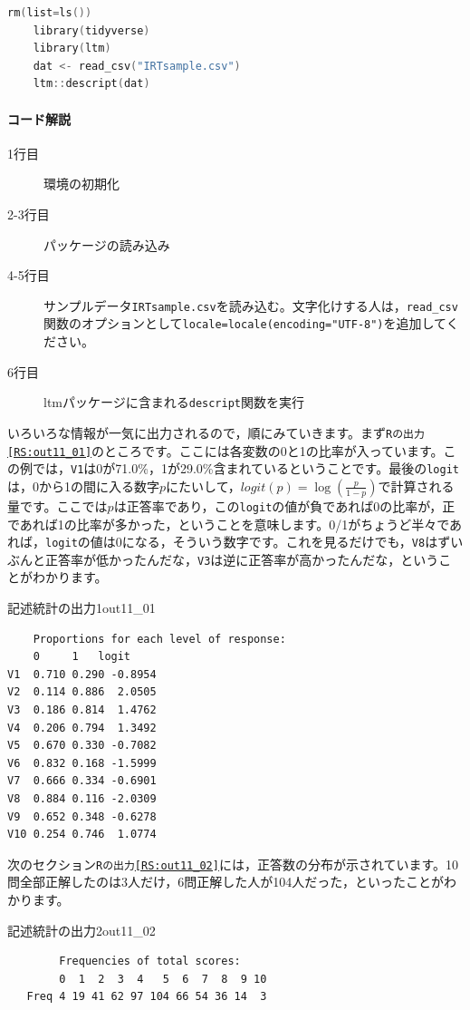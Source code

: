 \documentclass{ltjsbook}
\begin{document}
\begin{lstlisting}[language=c++,label={code:11_01},caption={データの読み込みから記述統計量の計算まで}]
    rm(list=ls())
    library(tidyverse)
    library(ltm)
    dat <- read_csv("IRTsample.csv")
    ltm::descript(dat)
\end{lstlisting}

\paragraph{コード解説}
\begin{description}
	\item[1行目] 環境の初期化
	\item[2-3行目] パッケージの読み込み
	\item[4-5行目] サンプルデータ\texttt{IRTsample.csv}を読み込む。文字化けする人は，\verb|read_csv|関数のオプションとして\texttt{locale=locale(encoding="UTF-8")}を追加してください。
	\item[6行目] ltmパッケージに含まれる\texttt{descript}関数を実行
\end{description}

いろいろな情報が一気に出力されるので，順にみていきます。まず\texttt{Rの出力\ref{RS:out11_01}}のところです。ここには各変数の0と1の比率が入っています。この例では，\texttt{V1}は0が71.0\%，1が29.0\%含まれているということです。最後の\texttt{logit}は，0から1の間に入る数字$p$にたいして，$logit(p)=\log\left(\frac{p}{1-p}\right)$で計算される量です。ここでは$p$は正答率であり，この\texttt{logit}の値が負であれば0の比率が，正であれば1の比率が多かった，ということを意味します。0/1がちょうど半々であれば，\texttt{logit}の値は0になる，そういう数字です。これを見るだけでも，\texttt{V8}はずいぶんと正答率が低かったんだな，\texttt{V3}は逆に正答率が高かったんだな，ということがわかります。
\begin{Rscreen}{記述統計の出力1}{out11_01}
	\begin{verbatim}
    Proportions for each level of response:
    0     1   logit
V1  0.710 0.290 -0.8954
V2  0.114 0.886  2.0505
V3  0.186 0.814  1.4762
V4  0.206 0.794  1.3492
V5  0.670 0.330 -0.7082
V6  0.832 0.168 -1.5999
V7  0.666 0.334 -0.6901
V8  0.884 0.116 -2.0309
V9  0.652 0.348 -0.6278
V10 0.254 0.746  1.0774
\end{verbatim}
\end{Rscreen}

次のセクション\texttt{Rの出力\ref{RS:out11_02}}には，正答数の分布が示されています。10問全部正解したのは3人だけ，6問正解した人が104人だった，といったことがわかります。
\begin{Rscreen}{記述統計の出力2}{out11_02}
	\begin{verbatim}
        Frequencies of total scores:
        0  1  2  3  4   5  6  7  8  9 10
   Freq 4 19 41 62 97 104 66 54 36 14  3
    \end{verbatim}
\end{Rscreen}
\end{document}

